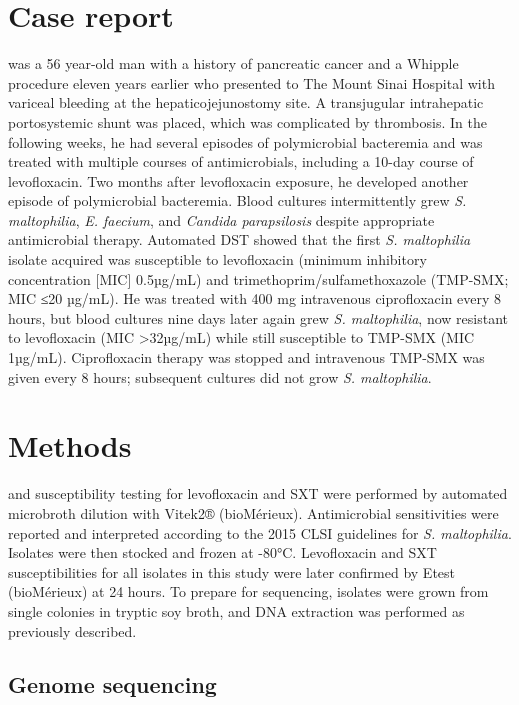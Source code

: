 \section{Case report}

 was a 56 year-old man with a history of pancreatic cancer and a Whipple procedure eleven years earlier who presented to The Mount Sinai Hospital with variceal bleeding at the hepaticojejunostomy site. A transjugular intrahepatic portosystemic shunt was placed, which was complicated by thrombosis. In the following weeks, he had several episodes of polymicrobial bacteremia and was treated with multiple courses of antimicrobials, including a 10-day course of levofloxacin. Two months after levofloxacin exposure, he developed another episode of polymicrobial bacteremia. Blood cultures intermittently grew \emph{S. maltophilia}, \emph{E. faecium}, and \emph{Candida parapsilosis} despite appropriate antimicrobial therapy. Automated DST showed that the first \emph{S. maltophilia} isolate acquired was susceptible to levofloxacin (minimum inhibitory concentration [MIC] 0.5µg/mL) and trimethoprim/sulfamethoxazole (TMP-SMX; MIC ≤20 µg/mL). He was treated with 400 mg intravenous ciprofloxacin every 8 hours, but blood cultures nine days later again grew \emph{S. maltophilia}, now resistant to levofloxacin (MIC >32µg/mL) while still susceptible to TMP-SMX (MIC 1µg/mL). Ciprofloxacin therapy was stopped and intravenous TMP-SMX was given every 8 hours; subsequent cultures did not grow \emph{S. maltophilia}.

\section{Methods}

 and susceptibility testing for levofloxacin and SXT were performed by automated microbroth dilution with Vitek2® (bioMérieux). Antimicrobial sensitivities were reported and interpreted according to the 2015 CLSI guidelines for \emph{S. maltophilia}.\autocite{ClinicalandLaboratoryStandardsInstitute2015} Isolates were then stocked and frozen at -80°C. Levofloxacin and SXT susceptibilities for all isolates in this study were later confirmed by Etest (bioMérieux) at 24 hours. To prepare for sequencing, isolates were grown from single colonies in tryptic soy broth, and DNA extraction was performed as previously described.\autocite{Altman2014}

\subsection{Genome sequencing}

